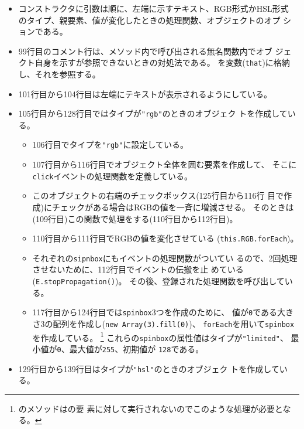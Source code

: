\begin{itemize}
 \item コンストラクタに引数は順に、左端に示すテキスト、RGB形式かHSL形式
			 のタイプ、親要素、値が変化したときの処理関数、オブジェクトのオプ
			 ションである。
 \item 99行目のコメント行は、メソッド内で呼び出される無名関数内でオブ
			 ジェクト自身を示すが参照できないときの対処法である。
			 を変数(\texttt{that})に格納し、それを参照する。
 \item 101行目から104行目は左端にテキストが表示されるようにしている。
 \item 105行目から128行目ではタイプが\texttt{"rgb"}のときのオブジェク
			 トを作成している。
			 \begin{itemize}
				\item 106行目でタイプを\texttt{"rgb"}に設定している。
				\item 107行目から116行目でオブジェクト全体を囲む要素を作成して、
							そこに\texttt{click}イベントの処理関数を定義している。
				\item このオブジェクトの右端のチェックボックス(125行目から116行
							目で作成)にチェックがある場合はRGBの値を一斉に増減させる。
							そのときは(109行目)この関数で処理をする(110行目から112行目)。
				\item 110行目から111行目でRGBの値を変化させている
							(\texttt{this.RGB.forEach})。
				\item それぞれの\texttt{sipnbox}にもイベントの処理関数がついてい
							るので、2回処理させないために、112行目でイベントの伝搬を止
							めている(\texttt{E.stopPropagation()})。
							その後、登録された処理関数を呼び出している。
			  \item 117行目から124行目では\texttt{spinbox}3つを作成のために、
							値が\texttt{0}である大きさ3の配列を作成し(\texttt{new
							Array(3).fill(0)})、
							\texttt{forEach}を用いて\texttt{spinbox}を作成している。
%
\footnote{	のメソッドはの要
							素に対して実行されないのでこのような処理が必要となる。
							}
							これらの\texttt{spinbox}の属性値はタイプが\texttt{"limited"}、
							最小値が\texttt{0}、最大値が\texttt{255}、初期値が
							\texttt{128}である。
			 \end{itemize}
 \item 129行目から139行目はタイプが\texttt{"hsl"}のときのオブジェク
			 トを作成している。
			 \begin{itemize}

\end{itemize}
\end{itemize}
